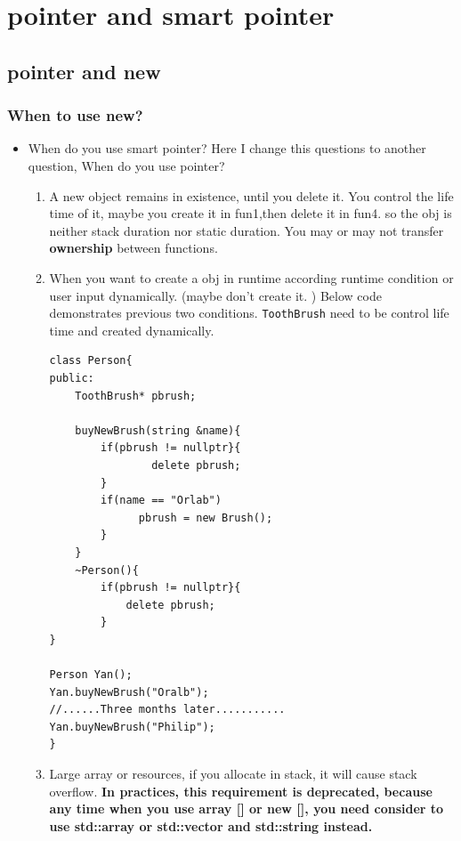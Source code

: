 \documentclass[a4paper,11pt,twoside]{book}
\begin{document}
\chapter{pointer and smart pointer}

\section{pointer and new}

\subsection{When to use new?}
\begin{itemize}
	

\item When do you use smart pointer? Here I change this questions to another question, When do you use pointer?
\begin{enumerate}

\item A new object remains in existence, until you delete it. You control the life time of it, maybe you create it in fun1,then delete it in fun4. so the obj is neither stack duration nor static duration. You may or may not transfer \textbf{ownership} between functions.

\item When you want to create a obj in runtime according runtime condition or user input dynamically. (maybe don't create it. ) Below code demonstrates previous two conditions.  \texttt{ToothBrush} need to be control life time and created dynamically.

\begin{lstlisting}[numbers=none]
class Person{
public:
	ToothBrush* pbrush;

	buyNewBrush(string &name){
	    if(pbrush != nullptr}{
		    	delete pbrush;
	    }
	    if(name == "Orlab")
	          pbrush = new Brush();
	    }
	}
	~Person(){
		if(pbrush != nullptr}{
			delete pbrush;
	    }
}

Person Yan();
Yan.buyNewBrush("Oralb");
//......Three months later...........
Yan.buyNewBrush("Philip");
}
\end{lstlisting}

\item Large array or resources,  if you allocate in stack, it will cause stack overflow. \textbf{In practices, this requirement is deprecated, because any time when you use array [] or new [], you need consider to use std::array or std::vector and std::string instead.}
\end{enumerate}

\end{itemize}
\end{document}
